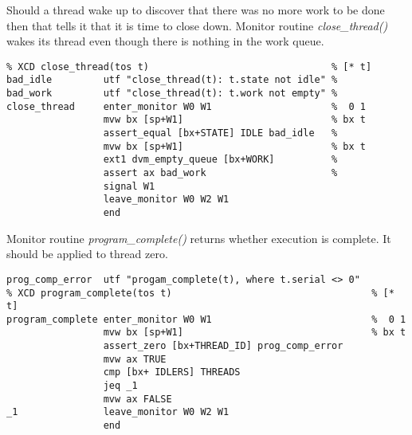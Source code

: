 Should a thread wake up to discover that there was no more work to be done then that tells it that it is time to close down. Monitor routine \emph{close\_thread()} wakes its thread even though there is nothing in the work queue.

\begin{tabbing}
\indents
{}
\finmore
\end{tabbing}

{\small
\begin{verbatim}
% XCD close_thread(tos t)                                % [* t]
bad_idle         utf "close_thread(t): t.state not idle" %
bad_work         utf "close_thread(t): t.work not empty" %
close_thread     enter_monitor W0 W1                     %  0 1
                 mvw bx [sp+W1]                          % bx t
                 assert_equal [bx+STATE] IDLE bad_idle   %
                 mvw bx [sp+W1]                          % bx t
                 ext1 dvm_empty_queue [bx+WORK]          %
                 assert ax bad_work                      %
                 signal W1
                 leave_monitor W0 W2 W1
                 end
\end{verbatim}}

Monitor routine \emph{program\_complete()} returns whether execution is complete. It should be applied to thread zero.

\begin{tabbing}
\indents
{}
\finmore
\end{tabbing}

{\small
\begin{verbatim}
prog_comp_error  utf "progam_complete(t), where t.serial <> 0"
% XCD program_complete(tos t)                                   % [* t]
program_complete enter_monitor W0 W1                            %  0 1
                 mvw bx [sp+W1]                                 % bx t
                 assert_zero [bx+THREAD_ID] prog_comp_error
                 mvw ax TRUE
                 cmp [bx+ IDLERS] THREADS
                 jeq _1
                 mvw ax FALSE
_1               leave_monitor W0 W2 W1
                 end
\end{verbatim}}

